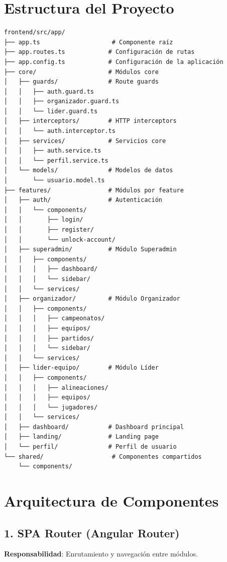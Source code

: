 \documentclass[
  spanish,
  11pt,
  letterpaper,
]{book}
\begin{document}
\section{Estructura del Proyecto}\label{estructura-del-proyecto}

\begin{verbatim}
frontend/src/app/
├── app.ts                    # Componente raíz
├── app.routes.ts            # Configuración de rutas
├── app.config.ts            # Configuración de la aplicación
├── core/                    # Módulos core
│   ├── guards/              # Route guards
│   │   ├── auth.guard.ts
│   │   ├── organizador.guard.ts
│   │   └── lider.guard.ts
│   ├── interceptors/        # HTTP interceptors
│   │   └── auth.interceptor.ts
│   ├── services/            # Servicios core
│   │   ├── auth.service.ts
│   │   └── perfil.service.ts
│   └── models/              # Modelos de datos
│       └── usuario.model.ts
├── features/                # Módulos por feature
│   ├── auth/                # Autenticación
│   │   └── components/
│   │       ├── login/
│   │       ├── register/
│   │       └── unlock-account/
│   ├── superadmin/          # Módulo Superadmin
│   │   ├── components/
│   │   │   ├── dashboard/
│   │   │   └── sidebar/
│   │   └── services/
│   ├── organizador/         # Módulo Organizador
│   │   ├── components/
│   │   │   ├── campeonatos/
│   │   │   ├── equipos/
│   │   │   ├── partidos/
│   │   │   └── sidebar/
│   │   └── services/
│   ├── lider-equipo/        # Módulo Líder
│   │   ├── components/
│   │   │   ├── alineaciones/
│   │   │   ├── equipos/
│   │   │   └── jugadores/
│   │   └── services/
│   ├── dashboard/           # Dashboard principal
│   ├── landing/             # Landing page
│   └── perfil/              # Perfil de usuario
└── shared/                   # Componentes compartidos
    └── components/
\end{verbatim}

\section{Arquitectura de Componentes}\label{arquitectura-de-componentes}

\subsection{1. SPA Router (Angular
Router)}\label{spa-router-angular-router}

\textbf{Responsabilidad}: Enrutamiento y navegación entre módulos.
\end{document}
